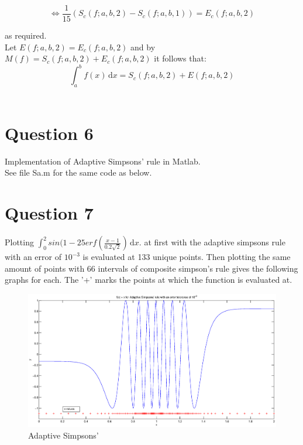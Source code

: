 \documentclass[fleqn]{report}
\begin{document}
\begin{equation*}
\iff \frac{1}{15}(S_c(f;a,b,2) - S_c(f;a,b,1)) = E_c(f;a,b,2)
\end{equation*}

as required.\\

\noindent Let $E(f;a,b,2) = E_c(f;a,b,2)$ and by $M(f) = S_c(f;a,b,2) + E_c(f;a,b,2)$ 
it follows that:\\

\begin{equation*}
\int_a^b \! f(x) \, \mathrm{d}x  = S_c(f;a,b,2) + E(f;a,b,2)
\end{equation*}
\\


\pagebreak

\section{Question 6}
Implementation of Adaptive Simpsons' rule in Matlab. \\

See file Sa.m for the same code as below.



\pagebreak

\section{Question 7}

Plotting $ \int_0^2 \! sin(1 - 25erf(\frac{x-1}{0.2\sqrt{2}}) \,\mathrm{d}x.$ 
at first with the adaptive simpsons rule with an error of $10^{-3}$ is evaluated at 
133 unique points. Then plotting the same amount of points with 66 intervals of composite 
simpson's rule gives the following graphs for each. The '+' marks the points at which
the function is evaluated at.

\begin{figure}[h!]
\begin{center}
    \centerline{\includegraphics[width=1.8\textwidth]{graphs/q7adaptive.eps}}
    \caption{Adaptive Simpsons'}
\end{center}
\end{figure}
\end{document}
